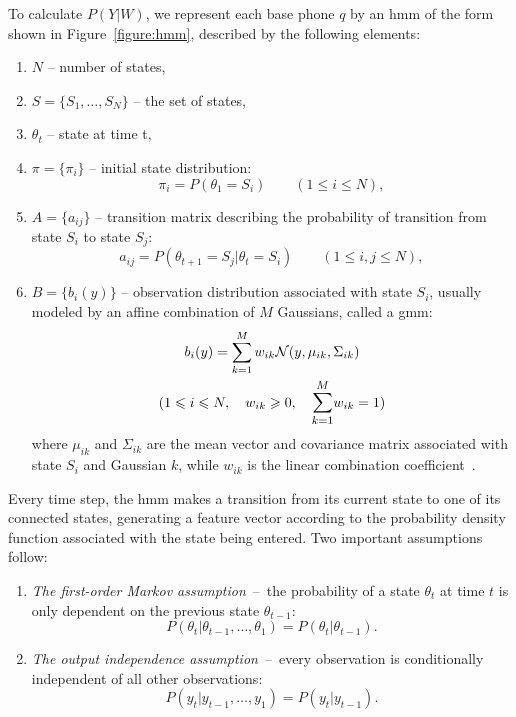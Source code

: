 To calculate $P(Y|W)$, we represent each base phone $q$ by an \gls{hmm} of the form shown in Figure~\ref{figure:hmm}, described by the following elements:
\begin{enumerate}
\item $N$ -- number of states,
\item $S=\{S_{1}, \ldots, S_{N}\}$ -- the set of states,
\item $\theta_{t}$ -- state at time t,
\item $\pi=\{\pi_{i}\}$ -- initial state distribution:
  \begin{equation*}
    \pi_{i}=P(\theta_{1}=S_{i}) \qquad (1 \leqslant i \leqslant N),
  \end{equation*}
\item $A=\{a_{ij}\}$ -- transition matrix describing the probability of transition from state $S_{i}$ to state $S_{j}$:
  \begin{equation*}
    a_{ij}=P(\theta_{t+1}=S_{j}|\theta_{t}=S_{i}) \qquad (1 \leqslant i, j \leqslant N), 
  \end{equation*}
\item $B=\{b_{i}(y)\}$ -- observation distribution associated with state $S_{i}$, usually modeled by an affine combination of $M$ Gaussians, called a \acrfull{gmm}:
    \begin{gather}
      b_{i}(y)=\sum_{k=1}^{M}w_{ik}\mathcal{N}(y, \mu_{ik}, \Sigma_{ik}) \\
      (1 \leqslant i \leqslant N, \quad w_{ik} \geqslant 0, \quad\mathlarger{\sum_{k=1}^{M}}w_{ik}=1)\nonumber
    \end{gather}
where $\mu_{ik}$ and $\Sigma_{ik}$ are the mean vector and covariance matrix associated with state $S_{i}$ and Gaussian $k$, while $w_{ik}$ is the linear combination coefficient~\cite{juang1985mixture}.
\end{enumerate}
Every time step, the \gls{hmm} makes a transition from its current state to one of its connected states, generating a feature vector according to the probability density function associated with the state being entered. Two important assumptions follow:
\begin{enumerate}
	\item \textit{The first-order Markov assumption}~--~the probability of a state $\theta_{t}$ at time $t$ is only dependent on the previous state $\theta_{t-1}$:
  \begin{equation}
    P(\theta_{t}|\theta_{t-1}, \ldots, \theta_{1})=P(\theta_{t}|\theta_{t-1}).
  \end{equation}
\item \textit{The output independence assumption}~--~every observation is conditionally independent of all other observations: 
  \begin{equation}
    P(y_{t}|y_{t-1}, \ldots, y_{1})=P(y_{t}|y_{t-1}).
  \end{equation}
\end{enumerate}
